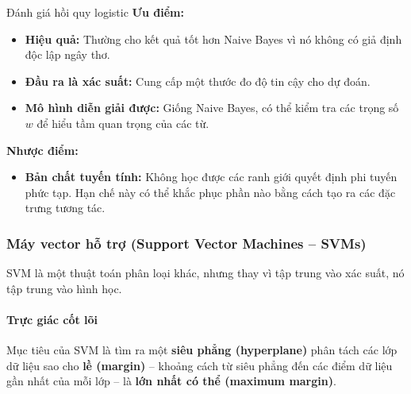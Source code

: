 \begin{assess}{Đánh giá hồi quy logistic}
\textbf{Ưu điểm:}
\begin{itemize}
    \item \textbf{Hiệu quả:} Thường cho kết quả tốt hơn Naive Bayes vì nó không có giả định độc lập ngây thơ.
    \item \textbf{Đầu ra là xác suất:} Cung cấp một thước đo độ tin cậy cho dự đoán.
    \item \textbf{Mô hình diễn giải được:} Giống Naive Bayes, có thể kiểm tra các trọng số $w$ để hiểu tầm quan trọng của các từ.
\end{itemize}
\textbf{Nhược điểm:}
\begin{itemize}
    \item \textbf{Bản chất tuyến tính:} Không học được các ranh giới quyết định phi tuyến phức tạp. Hạn chế này có thể khắc phục phần nào bằng cách tạo ra các đặc trưng tương tác.
\end{itemize}
\end{assess}

\subsubsection{Máy vector hỗ trợ (Support Vector Machines -- SVMs)}
SVM \cite{cortes1995support} là một thuật toán phân loại khác, nhưng thay vì tập trung vào xác suất, nó tập trung vào hình học.

\paragraph{Trực giác cốt lõi}
Mục tiêu của SVM là tìm ra một \textbf{siêu phẳng (hyperplane)} phân tách các lớp dữ liệu sao cho \textbf{lề (margin)} -- khoảng cách từ siêu phẳng đến các điểm dữ liệu gần nhất của mỗi lớp -- là \textbf{lớn nhất có thể (maximum margin)}.

\begin{center}
    \label{fig:svm_margin}
\end{center}

